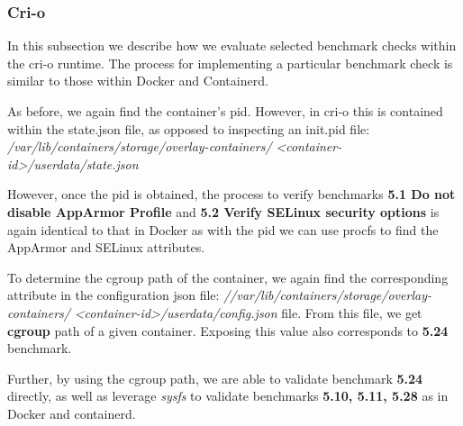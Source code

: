 \subsubsection*{Cri-o}

In this subsection we describe how we evaluate selected benchmark checks within the cri-o runtime. The process for implementing a particular benchmark check is similar to those within Docker and Containerd.

As before, we again find the container's pid. However, in cri-o this is contained within the state.json file, as opposed to inspecting an init.pid file: \textit{/var/lib/containers/storage/overlay-containers/} \textit{<container-id>/userdata/state.json}

However, once the pid is obtained, the process to verify benchmarks \textbf{5.1 Do not disable AppArmor Profile} and \textbf{5.2 Verify SELinux security options} is again identical to that in Docker as with the pid we can use procfs to find the AppArmor and SELinux attributes. 

To determine the cgroup path of the container, we again find the corresponding attribute in the configuration json file:
\textit{//var/lib/containers/storage/overlay-containers/} \textit{<container-id>/userdata/config.json} file.
From this file, we get \textbf{cgroup} path of a given container. Exposing this value also corresponds to \textbf{5.24} benchmark.

Further, by using the cgroup path, we are able to validate benchmark \textbf{5.24} directly, as well as leverage \textit{sysfs} to validate benchmarks \textbf{5.10, 5.11, 5.28} as in Docker and containerd. 
 